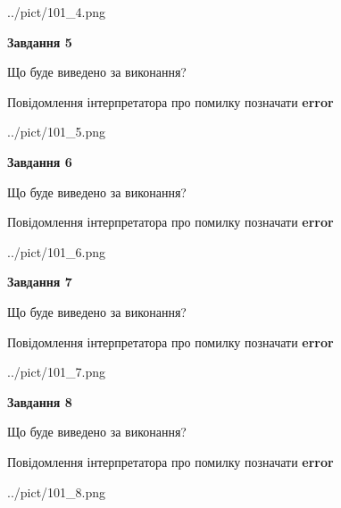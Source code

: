 \documentclass[12pt, ukrainian]{article}
\begin{document}
{\begin{center}
	{../pict/101_4.png}
\end{center}
\newpage

{\begin {center}\textbf{Завдання 5}\end {center}}\par
Що буде виведено за виконання? \par
Повідомлення інтерпретатора про помилку позначати \textbf{error}

\begin{center}
	{../pict/101_5.png}
\end{center}
\newpage

{\begin {center}\textbf{Завдання 6}\end {center}}\par
Що буде виведено за виконання? \par
Повідомлення інтерпретатора про помилку позначати \textbf{error}

\begin{center}
	{../pict/101_6.png}
\end{center}
\newpage

{\begin {center}\textbf{Завдання 7}\end {center}}\par
Що буде виведено за виконання? \par
Повідомлення інтерпретатора про помилку позначати \textbf{error}

\begin{center}
	{../pict/101_7.png}
\end{center}
\newpage

{\begin {center}\textbf{Завдання 8}\end {center}}\par
Що буде виведено за виконання? \par
Повідомлення інтерпретатора про помилку позначати \textbf{error}

\begin{center}
	{../pict/101_8.png}
\end{center}
\newpage

}
\end{document}

